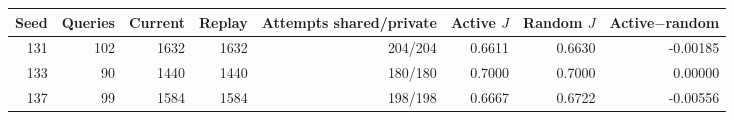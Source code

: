 \begin{tabular}{rrrrrrrr}
\toprule
Seed & Queries & Current & Replay & Attempts shared/private & Active $J$ & Random $J$ & Active$-$random \\
\midrule
131 & 102 & 1632 & 1632 & 204/204 & 0.6611 & 0.6630 & -0.00185 \\
133 & 90 & 1440 & 1440 & 180/180 & 0.7000 & 0.7000 & 0.00000 \\
137 & 99 & 1584 & 1584 & 198/198 & 0.6667 & 0.6722 & -0.00556 \\
\bottomrule
\end{tabular}
